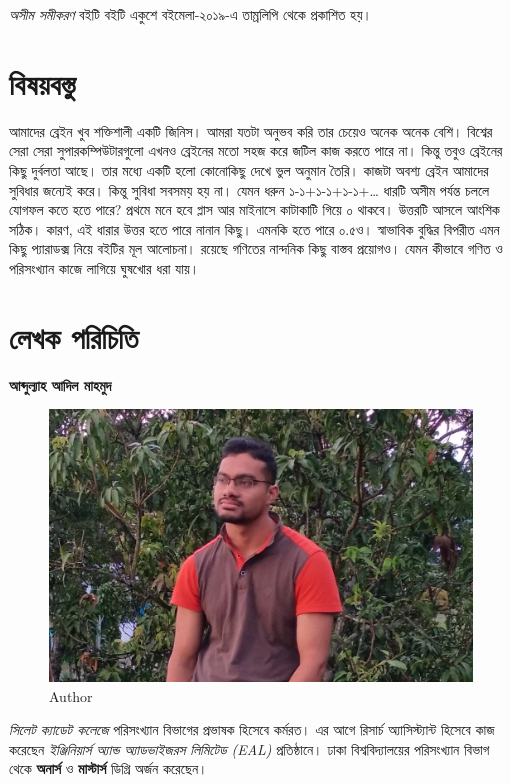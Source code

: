 \documentclass[
]{book}
\begin{document}
\emph{অসীম সমীকরণ} বইটি বইটি একুশে বইমেলা-২০১৯-এ তাম্রলিপি থেকে প্রকাশিত হয়।

\hypertarget{ux9acux9b7ux9dfux9acux9b8ux9a4}{%
\section{বিষয়বস্তু}\label{ux9acux9b7ux9dfux9acux9b8ux9a4}}

আমাদের ব্রেইন খুব শক্তিশালী একটি জিনিস। আমরা যতটা অনুভব করি তার চেয়েও অনেক অনেক বেশি। বিশ্বের সেরা সেরা সুপারকম্পিউটারগুলো এখনও ব্রেইনের মতো সহজ করে জটিল কাজ করতে পারে না। কিন্তু তবুও ব্রেইনের কিছু দুর্বলতা আছে। তার মধ্যে একটি হলো কোনোকিছু দেখে ভুল অনুমান তৈরি। কাজটা অবশ্য ব্রেইন আমাদের সুবিধার জন্যেই করে। কিন্তু সুবিধা সবসময় হয় না। যেমন ধরুন ১-১+১-১+১-১+\ldots{} ধারটি অসীম পর্যন্ত চললে যোগফল কতে হতে পারে? প্রথমে মনে হবে প্লাস আর মাইনাসে কাটাকাটি গিয়ে ০ থাকবে। উত্তরটি আসলে আংশিক সঠিক। কারণ, এই ধারার উত্তর হতে পারে নানান কিছু। এমনকি হতে পারে ০.৫ও। স্বাভাবিক বুদ্ধির বিপরীত এমন কিছু প্যারাডক্স নিয়ে বইটির মূল আলোচনা। রয়েছে গণিতের নান্দনিক কিছু বাস্তব প্রয়োগও। যেমন কীভাবে গণিত ও পরিসংখ্যান কাজে লাগিয়ে ঘুষখোর ধরা যায়।

\hypertarget{ux9b2ux996ux995-ux9aaux9b0ux99aux9a4}{%
\section{লেখক পরিচিতি}\label{ux9b2ux996ux995-ux9aaux9b0ux99aux9a4}}

\textbf{আব্দুল্যাহ আদিল মাহমুদ}

\begin{figure}

{\centering \includegraphics[width=0.5\linewidth]{mahmud} 

}

\caption{Author}\label{fig:author}
\end{figure}

\emph{সিলেট ক্যাডেট কলেজে} পরিসংখ্যান বিভাগের প্রভাষক হিসেবে কর্মরত। এর আগে রিসার্চ অ্যাসিস্ট্যান্ট হিসেবে কাজ করেছেন \emph{ইঞ্জিনিয়ার্স অ্যান্ড অ্যাডভাইজরস লিমিটেড (EAL)} প্রতিষ্ঠানে। ঢাকা বিশ্ববিদ্যালয়ের পরিসংখ্যান বিভাগ থেকে \textbf{অনার্স} ও \textbf{মাস্টার্স} ডিগ্রি অর্জন করেছেন।
\end{document}
